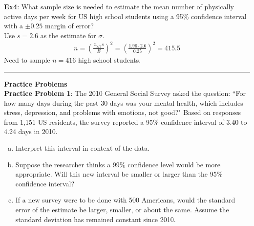 \documentclass[fleqn, 11pt]{article}\usepackage[]{graphicx}\usepackage[]{color}
\begin{document}
\clearpage

\textbf{Ex4}:  What sample size is needed to estimate the mean number of physically active days per week for US high school students using a 95\% confidence interval with a $\pm 0.25$ margin of error?\\  Use $s=2.6$ as the estimate for $\sigma$.
{\color{blue}
\begin{align*}
n = \left( \frac{z_{\alpha/2} s}{E} \right)^2
= \left( \frac{1.96 \cdot 2.6}{0.25} \right)^2
= 415.5
\end{align*}
Need to sample $n = 416$ high school students.\\
}

\begin{center} 
\rule{5in}{0.4pt}
\end{center}

\textbf{Practice Problems}\\

\textbf{Practice Problem 1}:  The 2010 General Social Survey asked the question: ``For how many days during the past 30 days was your mental health, which includes stress, depression, and problems with emotions, not good?" Based on responses from 1,151 US residents, the survey reported a 95\% confidence interval of 3.40 to 4.24 days in 2010.
\begin{enumerate}[(a)]
\item Interpret this interval in context of the data.
\item Suppose the researcher thinks a 99\% confidence level would be more appropriate. Will this new interval be smaller or larger than the 95\% confidence interval?
\item If a new survey were to be done with 500 Americans, would the standard error of the estimate be larger, smaller, or about the same. Assume the standard deviation has remained constant since 2010.\\
\end{enumerate}
\end{document}
